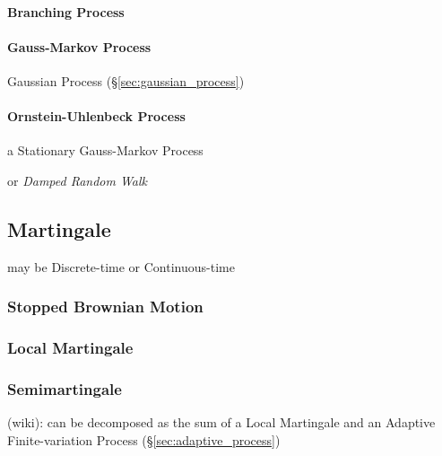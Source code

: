 \paragraph{Branching Process}\label{sec:branching_process}\hfill

\paragraph{Gauss-Markov Process}\label{sec:gauss_markov_process}\hfill

Gaussian Process (\S\ref{sec:gaussian_process})



\paragraph{Ornstein-Uhlenbeck Process}\label{sec:ornstein_uhlenbeck}\hfill

a Stationary Gauss-Markov Process

or \emph{Damped Random Walk}



\subsection{Martingale}\label{sec:martingale}

may be Discrete-time or Continuous-time



\subsubsection{Stopped Brownian Motion}\label{sec:stopped_brownian_motion}

\subsubsection{Local Martingale}\label{sec:local_martingale}

\subsubsection{Semimartingale}\label{sec:semimartingale}

(wiki): can be decomposed as the sum of a Local Martingale and an Adaptive
Finite-variation Process (\S\ref{sec:adaptive_process})

